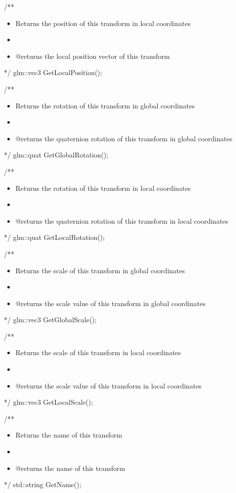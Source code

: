 \documentclass[11pt]{article}
\begin{document}
/**
\begin{itemize}
\item Returns the position of this transform in local coordinates
\item 

\item @returns the local position vector of this transform
\end{itemize}
 */
glm::vec3 GetLocalPosition();

/**
\begin{itemize}
\item Returns the rotation of this transform in global coordinates
\item 

\item @returns the quaternion rotation of this transform in global coordinates
\end{itemize}
 */
glm::quat GetGlobalRotation();

/**
\begin{itemize}
\item Returns the rotation of this transform in local coordinates
\item 

\item @returns the quaternion rotation of this transform in local coordinates
\end{itemize}
 */
glm::quat GetLocalRotation();



/**
\begin{itemize}
\item Returns the scale of this transform in global coordinates
\item 

\item @returns the scale value of this transform in global coordinates
\end{itemize}
 */
glm::vec3 GetGlobalScale();

/**
\begin{itemize}
\item Returns the scale of this transform in local coordinates
\item 

\item @returns the scale value of this transform in local coordinates
\end{itemize}
 */
glm::vec3 GetLocalScale();

/**
\begin{itemize}
\item Returns the name of this transform
\item 

\item @returns the name of this transform
\end{itemize}
 */
std::string GetName();
\end{document}
